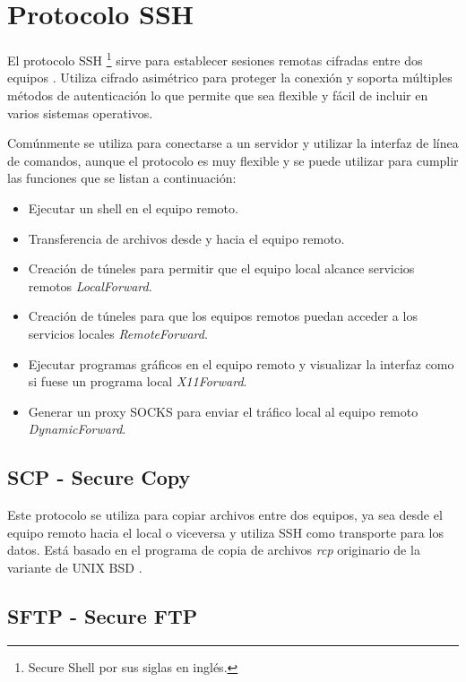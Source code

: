 \section {Protocolo SSH}
\label{Protocolo-SSH}
El protocolo \textsc{SSH} \footnote{Secure Shell por sus siglas en ingl\'{e}s.} sirve para establecer sesiones remotas cifradas entre dos equipos \cite{_ssh_????-1}. Utiliza cifrado asim\'{e}trico para proteger la conexi\'{o}n y soporta m\'{u}ltiples m\'{e}todos de autenticaci\'{o}n lo que permite que sea flexible y f\'{a}cil de incluir en varios sistemas operativos.

Com\'{u}nmente se utiliza para conectarse a un servidor y utilizar la interfaz de l\'{i}nea de comandos, aunque el protocolo es muy flexible y se puede utilizar para cumplir las funciones que se listan a continuaci\'{o}n:

  \begin{itemize}
    \item{Ejecutar un shell en el equipo remoto.}
    \item{Transferencia de archivos desde y hacia el equipo remoto.}
    \item{Creaci\'{o}n de t\'{u}neles para permitir que el equipo local alcance servicios remotos \textit{LocalForward}.}
    \item{Creaci\'{o}n de t\'{u}neles para que los equipos remotos puedan acceder a los servicios locales \textit{RemoteForward}.}
    \item{Ejecutar programas gr\'{a}ficos en el equipo remoto y visualizar la interfaz como si fuese un programa local \textit{X11Forward}.}
    \item{Generar un proxy \textsc{SOCKS} para enviar el tr\'{a}fico local al equipo remoto \textit{DynamicForward}.}
  \end{itemize}

  \subsection {SCP - Secure Copy}

Este protocolo se utiliza para copiar archivos entre dos equipos, ya sea desde el equipo remoto hacia el local o viceversa y utiliza \textsc{SSH} como transporte para los datos. Est\'{a} basado en el programa de copia de archivos \textit{rcp} originario de la variante de \textsc{UNIX} \textsc{BSD} \cite{_scp_????}.

  \subsection {SFTP - Secure FTP}

